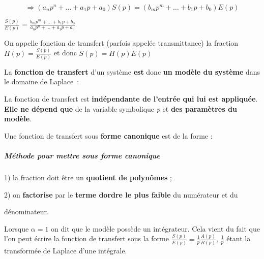 \[\Longrightarrow \left( a_{n}p^{n} + \ldots + a_{1}p + a_{0} \right)S(p) = \left( b_{m}p^{m} + \ldots + b_{1}p + b_{0} \right)E(p)\]

\(\frac{S(p)}{E(p)} = \frac{b_{m}p^{m} + \ldots + b_{1}p + b_{0}}{a_{n}p^{n} + \ldots + a_{1}p + a_{0}}\)

On appelle fonction de transfert (parfois appelée transmittance) la fraction \(H(p) = \frac{S(p)}{E(p)}\) et donc \(S(p) = H(p)E(p)\)

La \textbf{fonction de transfert} d'un système \textbf{est} donc \textbf{un modèle du système} dans le domaine de Laplace~:

La fonction de transfert est \textbf{indépendante de l'entrée qui lui est appliquée}. \textbf{Elle ne dépend que} de la variable symbolique \emph{p} et \textbf{des paramètres du modèle}.

Une fonction de transfert sous \textbf{forme canonique} est de la forme :

\hypertarget{muxe9thode-pour-mettre-sous-forme-canonique}{%
\subparagraph*{Méthode pour mettre sous forme canonique~}\label{muxe9thode-pour-mettre-sous-forme-canonique}}

1) la fraction doit être un \textbf{quotient de polynômes} ;

2) on \textbf{factorise} par le \textbf{terme d\textquotesingle ordre le plus faible} du numérateur et du

dénominateur.

Lorsque \(\alpha = 1\) on dit que le modèle possède un intégrateur. Cela vient du fait que l'on peut écrire la fonction de transfert sous la forme \(\frac{S(p)}{E(p)} = \frac{1}{p}\frac{A(p)}{B(p)}\), \(\frac{1}{p}\) étant la transformée de Laplace d'une intégrale.

